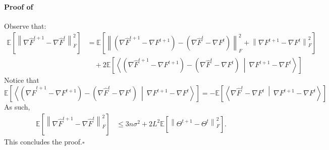 \documentclass[10pt]{article} %
\theoremstyle{plain}
\theoremstyle{definition}
\theoremstyle{remark}
\newcommand{\grdF}{\nabla F}
\newcommand{\dotp}[2]{\left\langle{#1}\ \middle|\ {#2}\right\rangle}
\newcommand{\norm}[1]{\left\| #1 \right\|}
\newcommand{\nl}{\nonumber\\}
\newcommand{\grdSF}{\nabla \widehat{F}}
\begin{document}
\paragraph{Proof of } Observe that:
\begin{align*}
\mathbb{E} \left[ \norm{ \grdSF^{t+1} - \grdSF^t }_F^2 \right] & = \mathbb{E} \left[ \norm{ (\grdSF^{t+1} - \grdF^{t+1}) - (\grdSF^t - \grdF^t) }_F^2 + \norm{ \grdF^{t+1} - \grdF^t }_F^2 \right] \nl 
& \quad + 2 \mathbb{E}\left[ \dotp{ (\grdSF^{t+1} - \grdF^{t+1}) - (\grdSF^t - \grdF^t) }{ \grdF^{t+1} - \grdF^t } \right] \nonumber
\end{align*}
Notice that 
\[ 
\mathbb{E}\left[ \dotp{ (\grdSF^{t+1} - \grdF^{t+1}) - (\grdSF^t - \grdF^t) }{ \grdF^{t+1} - \grdF^t } \right] 
= - \mathbb{E}\left[ \dotp{ \grdSF^t - \grdF^t }{ \grdF^{t+1} - \grdF^t } \right] 
\] 
As such,
\begin{align*}
\mathbb{E} \left[ \norm{ \grdSF^{t+1} - \grdSF^t }_F^2 \right] & \leq 3 n \sigma^2 + 2 L^2 \mathbb{E} \left[ \norm{ \Theta^{t+1} - \Theta^t }_F^2 \right].
\end{align*}
This concludes the proof.\hfill $\square$
\end{document}
